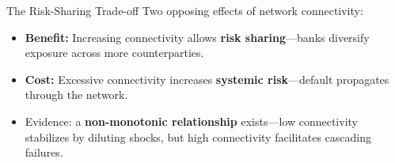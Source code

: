 \begin{frame}{The Risk-Sharing Trade-off}
  Two opposing effects of network connectivity:
  \begin{itemize}
    \item \textbf{Benefit:} Increasing connectivity allows \textbf{risk sharing}---banks diversify exposure across more counterparties.
    \item \textbf{Cost:} Excessive connectivity increases \textbf{systemic risk}---default propagates through the network.
    \item Evidence: a \textbf{non-monotonic relationship} exists---low connectivity stabilizes by diluting shocks, but high connectivity facilitates cascading failures.
  \end{itemize}
\end{frame}


